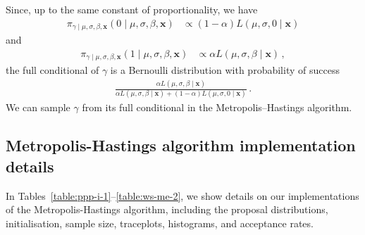 \documentclass{article}
\newcommand{\metrogroup}[4]{
	\begin{table}
		\caption{Metropolis-Hastings algorithm for #2
			with $k = 3$ and #4 copula prior.}
		\centering
		\renewcommand{\arraystretch}{1.2}
		
		\label{table:#1-#3-1}
	\end{table}
	
	\begin{table}
		\caption{Metropolis algorithm for #2
			with $k = 3$ and #4 copula posterior.}
		\centering
		\renewcommand{\arraystretch}{1.2}
		
	\end{table}

	\begin{table}
		\caption{Metropolis-Hastings algorithm for #2
			with $k = 2$ and #4 copula posterior.}
		\centering
		\renewcommand{\arraystretch}{1.2}
		
		\label{table:#1-#3-2}
	\end{table}
}
\newcommand{\metroall}[2]{
	\metrogroup{#1}{#2}{i}{independent}
	\metrogroup{#1}{#2}{me}{maximum entropy}
}
\begin{document}
%
Since, up to the same constant of proportionality, we have
%
\begin{align*}
	\pi_{\gamma \mid \mu, \sigma, \beta, \mathbf{x}}
		(0 \mid \mu, \sigma, \beta, \mathbf{x}) &\propto
		(1 - \alpha) L(\mu, \sigma, 0 \mid \mathbf{x})
\end{align*}
and
\begin{align*}
	\pi_{\gamma \mid \mu, \sigma, \beta, \mathbf{x}}
		(1 \mid \mu, \sigma, \beta, \mathbf{x}) &\propto
		\alpha L(\mu, \sigma, \beta \mid \mathbf{x}) \,,
\end{align*}
%
the full conditional of $\gamma$ is a Bernoulli distribution
with probability of success
%
\begin{align*}
	\frac{\alpha L(\mu, \sigma, \beta \mid \mathbf{x})}
		{\alpha L(\mu, \sigma, \beta \mid \mathbf{x})
		+ (1 - \alpha) L(\mu, \sigma, 0 \mid \mathbf{x})} \,.
\end{align*}
%
We can sample $\gamma$ from its full conditional
in the Metropolis–Hastings algorithm.
%
\subsection{Metropolis-Hastings algorithm implementation details}
\label{appendix:mcmc-tables}
%

%
In Tables~\ref{table:ppp-i-1}--\ref{table:ws-me-2},
we show details on our
implementations of the Metropolis-Hastings algorithm, including
the proposal distributions, initialisation, sample size, traceplots,
histograms, and acceptance rates.
%
\metroall{ppp}{simulation study}
\metroall{ws}{wind speed data}
%
\FloatBarrier
\printbibliography
%
\end{document}
